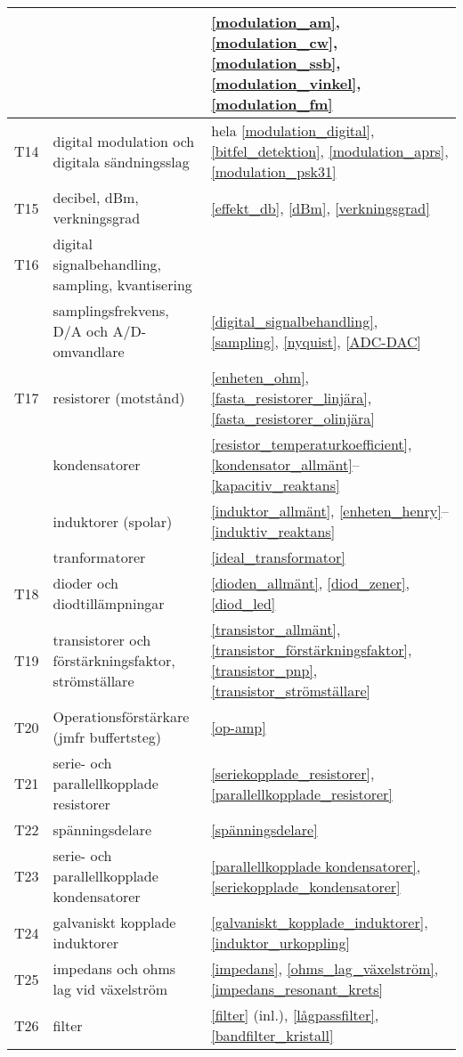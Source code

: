 \begin{table}[H]
\begin{tabular}{rll}
 && \ref{modulation_am}, \ref{modulation_cw}, \ref{modulation_ssb}, 
 \ref{modulation_vinkel}, \ref{modulation_fm}\\ \hline
T14 & digital modulation och digitala sändningsslag &
hela \ref{modulation_digital}, \ref{bitfel_detektion}, \ref{modulation_aprs}, 
\ref{modulation_psk31}\\ \hline
T15 & decibel, dBm, verkningsgrad &
\ref{effekt_db}, \ref{dBm}, \ref{verkningsgrad}\\ \hline
T16 & digital signalbehandling, sampling, kvantisering & \\
   & samplingsfrekvens, D/A och A/D-omvandlare &
\ref{digital_signalbehandling}, \ref{sampling}, \ref{nyquist}, \ref{ADC-DAC}\\ \hline
T17 & resistorer (motstånd) & 
\ref{enheten_ohm}, \ref{fasta_resistorer_linjära}, \ref{fasta_resistorer_olinjära}\\
& kondensatorer & 
\ref{resistor_temperaturkoefficient}, \ref{kondensator_allmänt}--\ref{kapacitiv_reaktans}\\ 
& induktorer (spolar) &
\ref{induktor_allmänt}, \ref{enheten_henry}--\ref{induktiv_reaktans} \\
& tranformatorer & 
\ref{ideal_transformator} \\ \hline
T18 & dioder och diodtillämpningar &
\ref{dioden_allmänt}, \ref{diod_zener}, \ref{diod_led}\\ \hline
T19 & transistorer och förstärkningsfaktor, strömställare &
\ref{transistor_allmänt}, \ref{transistor_förstärkningsfaktor}, \ref{transistor_pnp}, 
\ref{transistor_strömställare} \\ \hline
T20 & Operationsförstärkare (jmfr buffertsteg) & 
\ref{op-amp} \\ \hline
T21 & serie- och parallellkopplade resistorer &
\ref{seriekopplade_resistorer}, \ref{parallellkopplade_resistorer}\\ \hline
T22 & spänningsdelare & 
\ref{spänningsdelare}\\ \hline
T23 & serie- och parallellkopplade kondensatorer & 
\ref{parallellkopplade kondensatorer}, \ref{seriekopplade_kondensatorer} \\ \hline
T24 & galvaniskt kopplade induktorer & 
\ref{galvaniskt_kopplade_induktorer}, \ref{induktor_urkoppling}\\ \hline
T25 & impedans och ohms lag vid växelström & 
\ref{impedans}, \ref{ohms_lag_växelström}, \ref{impedans_resonant_krets}\\ \hline
T26 & filter & 
\ref{filter} (inl.), \ref{lågpassfilter}, \ref{bandfilter_kristall} \\ \hline

\end{tabular}
\end{table}
